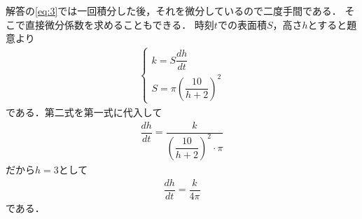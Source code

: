 \documentclass[../../main.tex]{subfiles}
\begin{document}
解答の\cref{eq:3}では一回積分した後，それを微分しているので二度手間である．
そこで直接微分係数を求めることもできる．
時刻$t$での表面積$S$，高さ$h$とすると題意より
\begin{align}
  \begin{cases}
    k = S \dfrac{dh}{dt} \\
    S = \pi \left(\dfrac{10}{h+2}\right)^2
  \end{cases}
\end{align}
である．第二式を第一式に代入して
\begin{align}
  \dfrac{dh}{dt} = \dfrac{k}{\left(\dfrac{10}{h+2}\right)^2 \cdot \pi}
\end{align}
だから$h=3$として
\begin{align}
  \dfrac{dh}{dt} = \dfrac{k}{4\pi}
\end{align}
である．
\end{document}
